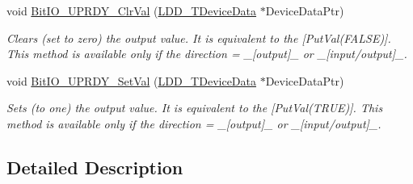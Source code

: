 \begin{DoxyCompactItemize}
void \hyperlink{group___bit_i_o___u_p_r_d_y__module_gae41a939598ee06853fa018667b9ba27a}{Bit\-I\-O\-\_\-\-U\-P\-R\-D\-Y\-\_\-\-Clr\-Val} (\hyperlink{group___p_e___types__module_gac5cf1362f1f0e3a2ce71b1bf2276d091}{L\-D\-D\-\_\-\-T\-Device\-Data} $\ast$Device\-Data\-Ptr)
\begin{DoxyCompactList}\small\item\em Clears (set to zero) the output value. It is equivalent to the \mbox{[}Put\-Val(\-F\-A\-L\-S\-E)\mbox{]}. This method is available only if the direction = \-\_\-\mbox{[}output\mbox{]}\-\_\- or \-\_\-\mbox{[}input/output\mbox{]}\-\_\-. \end{DoxyCompactList}\item 
void \hyperlink{group___bit_i_o___u_p_r_d_y__module_gac70117da5c49eebd6eed8745bc7db5ac}{Bit\-I\-O\-\_\-\-U\-P\-R\-D\-Y\-\_\-\-Set\-Val} (\hyperlink{group___p_e___types__module_gac5cf1362f1f0e3a2ce71b1bf2276d091}{L\-D\-D\-\_\-\-T\-Device\-Data} $\ast$Device\-Data\-Ptr)
\begin{DoxyCompactList}\small\item\em Sets (to one) the output value. It is equivalent to the \mbox{[}Put\-Val(\-T\-R\-U\-E)\mbox{]}. This method is available only if the direction = \-\_\-\mbox{[}output\mbox{]}\-\_\- or \-\_\-\mbox{[}input/output\mbox{]}\-\_\-. \end{DoxyCompactList}\end{DoxyCompactItemize}


\subsection{Detailed Description}


